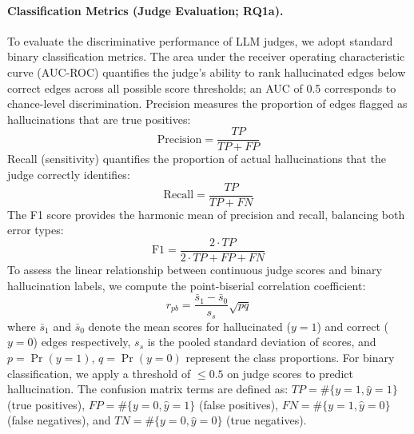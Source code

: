 \paragraph{Classification Metrics (Judge Evaluation; RQ1a).}
To evaluate the discriminative performance of LLM judges, we adopt standard binary classification metrics. The area under the receiver operating characteristic curve (AUC-ROC) quantifies the judge's ability to rank hallucinated edges below correct edges across all possible score thresholds; an AUC of 0.5 corresponds to chance-level discrimination. Precision measures the proportion of edges flagged as hallucinations that are true positives:
    \begin{equation}
        \mathrm{Precision} = \frac{TP}{TP + FP}
    \end{equation}
Recall (sensitivity) quantifies the proportion of actual hallucinations that the judge correctly identifies:
    \begin{equation}
        \mathrm{Recall} = \frac{TP}{TP + FN}
    \end{equation}
The F1 score provides the harmonic mean of precision and recall, balancing both error types:
    \begin{equation}
        \mathrm{F1} = \frac{2 \cdot TP}{2 \cdot TP + FP + FN}
    \end{equation}
To assess the linear relationship between continuous judge scores and binary hallucination labels, we compute the point-biserial correlation coefficient:
    \begin{equation}
        r_{pb}=\frac{\bar{s}_1-\bar{s}_0}{s_s}\sqrt{pq}
    \end{equation}
where $\bar{s}_1$ and $\bar{s}_0$ denote the mean scores for hallucinated ($y{=}1$) and correct ($y{=}0$) edges respectively, $s_s$ is the pooled standard deviation of scores, and $p=\Pr(y{=}1)$, $q=\Pr(y{=}0)$ represent the class proportions. For binary classification, we apply a threshold of $\leq 0.5$ on judge scores to predict hallucination. The confusion matrix terms are defined as: $TP=\#\{y{=}1,\hat{y}{=}1\}$ (true positives), $FP=\#\{y{=}0,\hat{y}{=}1\}$ (false positives), $FN=\#\{y{=}1,\hat{y}{=}0\}$ (false negatives), and $TN=\#\{y{=}0,\hat{y}{=}0\}$ (true negatives).

